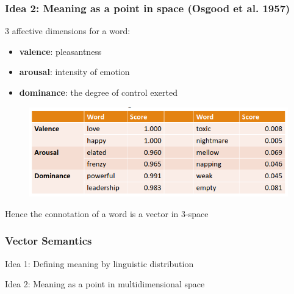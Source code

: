 \documentclass[13.5pt,aspecratio=169, xcolor=dvipsnames]{beamer}
\begin{document}
    \begin{frame}
        \onehalfspacing
            \frametitle{Idea 2: Meaning as a point in space (Osgood et al. 1957)}
            \begin{block}{3 affective dimensions for a word:}
                \begin{itemize}
                    \item \textbf{valence}: pleasantness
                    \item \textbf{arousal}: intensity of emotion
                    \item \textbf{dominance}: the degree of control exerted
                \end{itemize}
            \end{block}
            \begin{figure}[h]
                \centering
                \includegraphics[width=\textwidth]{idea_2.png}
                \captionsetup{labelformat=empty}

            \end{figure}
                Hence the connotation of a word is a vector in 3-space
        \end{frame}

        \begin{frame}
            \onehalfspacing
                \frametitle{Vector Semantics}
                {\Large
                Idea 1: Defining meaning by linguistic distribution

                \bigskip

                Idea 2: Meaning as a point in multidimensional space
                }
            \end{frame}
\end{document}
